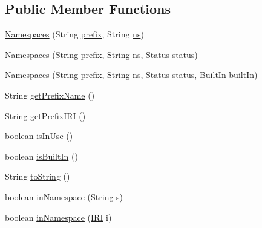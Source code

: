 \subsection*{Public Member Functions}
\begin{DoxyCompactItemize}
\item 
\hyperlink{enumorg_1_1semanticweb_1_1owlapi_1_1vocab_1_1_namespaces_ade7d6ad30eaf476efd8a2040d221dc38}{Namespaces} (String \hyperlink{enumorg_1_1semanticweb_1_1owlapi_1_1vocab_1_1_namespaces_ab0b84686444b1712130cd555c9bfbbf4}{prefix}, String \hyperlink{enumorg_1_1semanticweb_1_1owlapi_1_1vocab_1_1_namespaces_a88428054d2db7e7520b71b395aef20ac}{ns})
\item 
\hyperlink{enumorg_1_1semanticweb_1_1owlapi_1_1vocab_1_1_namespaces_aed21637505ede3cb2f6af0250c8a2672}{Namespaces} (String \hyperlink{enumorg_1_1semanticweb_1_1owlapi_1_1vocab_1_1_namespaces_ab0b84686444b1712130cd555c9bfbbf4}{prefix}, String \hyperlink{enumorg_1_1semanticweb_1_1owlapi_1_1vocab_1_1_namespaces_a88428054d2db7e7520b71b395aef20ac}{ns}, Status \hyperlink{enumorg_1_1semanticweb_1_1owlapi_1_1vocab_1_1_namespaces_ae28791da010806ce31d87f0a53ba6bb7}{status})
\item 
\hyperlink{enumorg_1_1semanticweb_1_1owlapi_1_1vocab_1_1_namespaces_adb60230b8d5618be587eb07d86dd4fb6}{Namespaces} (String \hyperlink{enumorg_1_1semanticweb_1_1owlapi_1_1vocab_1_1_namespaces_ab0b84686444b1712130cd555c9bfbbf4}{prefix}, String \hyperlink{enumorg_1_1semanticweb_1_1owlapi_1_1vocab_1_1_namespaces_a88428054d2db7e7520b71b395aef20ac}{ns}, Status \hyperlink{enumorg_1_1semanticweb_1_1owlapi_1_1vocab_1_1_namespaces_ae28791da010806ce31d87f0a53ba6bb7}{status}, Built\-In \hyperlink{enumorg_1_1semanticweb_1_1owlapi_1_1vocab_1_1_namespaces_a7da60dac2579b84cd14c7846aefe0f44}{built\-In})
\item 
String \hyperlink{enumorg_1_1semanticweb_1_1owlapi_1_1vocab_1_1_namespaces_a704e75ec90663995d96cb8db51112394}{get\-Prefix\-Name} ()
\item 
String \hyperlink{enumorg_1_1semanticweb_1_1owlapi_1_1vocab_1_1_namespaces_a82676c150a5478d3c904e6554a51b186}{get\-Prefix\-I\-R\-I} ()
\item 
boolean \hyperlink{enumorg_1_1semanticweb_1_1owlapi_1_1vocab_1_1_namespaces_acff1ae8746396f15749a4f64cf0fef60}{is\-In\-Use} ()
\item 
boolean \hyperlink{enumorg_1_1semanticweb_1_1owlapi_1_1vocab_1_1_namespaces_a7e301f3b2134df8ecfec1e39356cacbe}{is\-Built\-In} ()
\item 
String \hyperlink{enumorg_1_1semanticweb_1_1owlapi_1_1vocab_1_1_namespaces_a21c5d57ff1ae98f7c604df28e4c6bd90}{to\-String} ()
\item 
boolean \hyperlink{enumorg_1_1semanticweb_1_1owlapi_1_1vocab_1_1_namespaces_a0a607b31bc29a9c35b443cc94ec7d1f7}{in\-Namespace} (String s)
\item 
boolean \hyperlink{enumorg_1_1semanticweb_1_1owlapi_1_1vocab_1_1_namespaces_a80d24e1ee6f15f9ba0ebce5bef78f795}{in\-Namespace} (\hyperlink{classorg_1_1semanticweb_1_1owlapi_1_1model_1_1_i_r_i}{I\-R\-I} i)
\end{DoxyCompactItemize}

